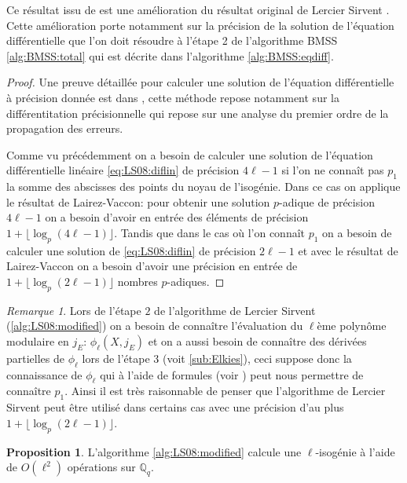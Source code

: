 \documentclass[10pt,a4paper]{book}
\theoremstyle{plain}
\theoremstyle{definition}
\theoremstyle{definition}
\theoremstyle{definition}
\newtheorem{prop}[thm]{Proposition}
\theoremstyle{definition}
\theoremstyle{remark}
\newtheorem{rem}[thm]{Remarque}
\theoremstyle{remark}
\theoremstyle{definition}
\begin{document}
Ce résultat issu de \cite{LairezVaccon16} est une amélioration du résultat original de Lercier Sirvent \cite{Lercier-Sirvent2008}. Cette amélioration porte notamment sur la précision de la solution de l'équation différentielle que l'on doit résoudre à l'étape 2 de l'algorithme BMSS \ref{alg:BMSS:total} qui est décrite dans l'algorithme \ref{alg:BMSS:eqdiff}.

\begin{proof}
Une preuve détaillée pour calculer une solution de l'équation différentielle à précision donnée est dans \cite{LairezVaccon16}, cette méthode repose notamment sur la différentitation précisionnelle qui repose sur une analyse du premier ordre de la propagation des erreurs. 

Comme vu précédemment on a besoin de calculer une solution de l'équation différentielle linéaire \eqref{eq:LS08:diflin} de précision $4\ell-1$ si l'on ne connaît pas $p_1$ la somme des abscisses des points du noyau de l'isogénie. Dans ce cas on applique le résultat de Lairez-Vaccon: pour obtenir une solution $p$-adique de précision $4 \ell-1$ on a besoin d'avoir en entrée des éléments de précision $ 1 + \lfloor \log_p(4 \ell - 1) \rfloor $. Tandis que dans le cas où l'on connaît $p_1$ on a besoin de calculer une solution de \eqref{eq:LS08:diflin} de précision $2\ell - 1$ et avec le résultat de Lairez-Vaccon on a besoin d'avoir une précision en entrée de $ 1 + \lfloor \log_p(2 \ell - 1) \rfloor $ nombres $p$-adiques.
\end{proof}

\begin{rem}
Lors de l'étape $2$ de l'algorithme de  Lercier Sirvent (\ref{alg:LS08:modified}) on a besoin de connaître l'évaluation du $\ell$ème polynôme modulaire en $j_E$: $\phi_{\ell}(X,j_E)$ et on a aussi besoin de connaître des dérivées partielles de $\phi_{\ell}$ lors de l'étape $3$ (voit \ref{sub:Elkies}), ceci suppose donc la connaissance de $\phi_{\ell}$ qui à l'aide de formules (voir \cite[Theoreme 17.22]{ehcc05}) peut nous permettre de connaître $p_1$. Ainsi il est très raisonnable de penser que l'algorithme de Lercier Sirvent peut être utilisé dans certains cas avec une précision d'au plus $1 + \lfloor \log_{p}(2\ell - 1) \rfloor$.
\end{rem}

\begin{prop}
L'algorithme \ref{alg:LS08:modified} calcule une $\ell$-isogénie à l'aide de $O(\ell^2)$  opérations sur $\mathbb{Q}_q$.
\end{prop}
\end{document}

